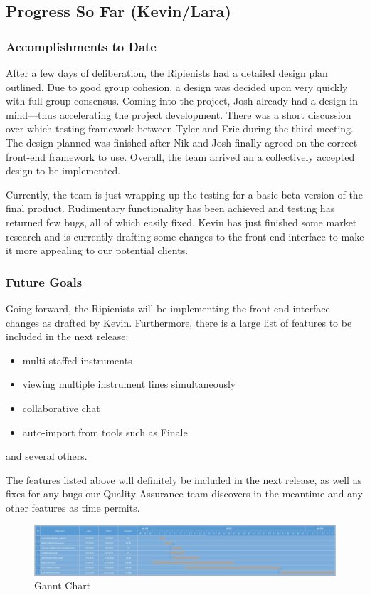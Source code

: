 \documentclass[12pt]{article}
\begin{document}
\subsection{Progress So Far (Kevin/Lara)}
\subsubsection{Accomplishments to Date}
After a few days of deliberation, the Ripienists had a detailed design plan outlined. Due to good group cohesion, a design was decided upon very quickly with full group consensus. Coming into the project, Josh already had a design in mind---thus accelerating the project development. There was a short discussion over which testing framework between Tyler and Eric during the third meeting. The design planned was finished after Nik and Josh finally agreed on the correct front-end framework to use. Overall, the team arrived an a collectively accepted design to-be-implemented.

Currently, the team is just wrapping up the testing for a basic beta version of the final product. Rudimentary functionality has been achieved and testing has returned few bugs, all of which easily fixed. Kevin has just finished some market research and is currently drafting some changes to the front-end interface to make it more appealing to our potential clients.

\subsubsection{Future Goals}
Going forward, the Ripienists will be implementing the front-end interface changes as drafted by Kevin. Furthermore, there is a large list of features to be included in the next release:
\begin{itemize}
\item multi-staffed instruments
\item viewing multiple instrument lines simultaneously
\item collaborative chat
\item auto-import from tools such as Finale
\end{itemize}
and several others.

The features listed above will definitely be included in the next release, as well as fixes for any bugs our Quality Assurance team discovers in the meantime and any other features as time permits.

\begin{figure}[ht]
\centering
\includegraphics[width=\textwidth]{gannt.jpg}
\caption{Gannt Chart}
\end{figure}
\end{document}
